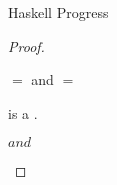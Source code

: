\begin{theorem}{Haskell Progress}
\begin{proof}
\begin{case}{\pshm}
\begin{subcase}{\first{\vartyh} $=$ \x and \first{\vartym} $=$ \y}
\psvaleqm
{\first{\varexpm}}
{\tyfor{\second{\tyvarm}}{\third{\vartym}}}
{\z}
\psred
{\exphm{(\x)}{(\y)}{(\z)}}
{\exptabs{\first{\tyvarh}}{\exphm{\second{\vartyh}}{\tysubst{\second{\vartym}}{\tylump}{\first{\tyvarm}}}{\expsubst{\second{\varexpm}}{\tylump}{\second{\tyvarm}}}}}

\end{subcase}

\pssub
{\first{\varexpm}}
{\second{\varexpm}}
{\pshm}
{\exphm{\first{\vartyh}}{\first{\vartym}}{\second{\varexpm}}}
\pserr
{\first{\varexpm}}
{\pshm}

\end{case}


\newcommand{\pshs}{\exphs{\first{\varcsh}}{\first{\varexps}}}

\begin{case}{\pshs}

\pshypby
{\first{\varexps}}
{\second{\varexps}}
\pscasesone
{\first{\varexps}}
{\first{\varcsh}}
{\pshs}


\begin{subcase}{\cslump}

\exphs{\cslump}{\first{\varexps}} is a \profv.

\end{subcase}


\begin{subcase}{\csnum}

\psred
{\exphs{\csnum}{\expnum{\varnum}}}
{{\expnum{\varnum}}}
\psrednote
{\exphs{\csnum}{\first{\varexps}}}
{\expwrongs{\tynum}{\errnum}}
{\first{\varexps} \neq \expnum{\varnum}}

\end{subcase}


\renewcommand{\x}{\cslist{\second{\varcsh}}}

\begin{subcase}{\x}

\psred
{\exphs{\x}{\expnild}}
{\expnils{\tyunbrand{\second{\varcsh}}}}
\psred
{\exphs{\x}{(\expcons{\first{\varvalus}}{\second{\varvalus}})}}
{\expcons{(\exphs{\varcsh}{\first{\varvalus}})}{(\exphs{\x}{\second{\varvalus}})}}
\psrednote
{\exphs{\x}{\first{\varexps}}}
{\expwrongs{\tyunbrand{\x}}{\errlist}}
{\first{\varexps} \neq \expnild$ and $\first{\varexps} \neq \expcons{\first{\varvalus}}{\second{\varvalus}}}

\end{subcase}


\end{case}
\end{proof}
\end{theorem}
